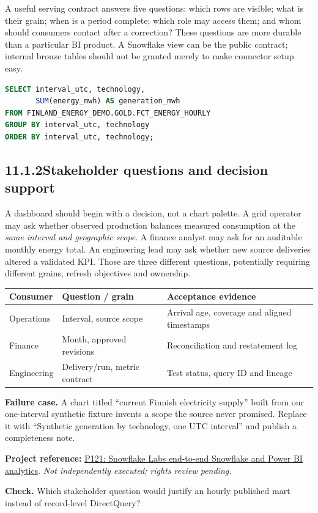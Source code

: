 \documentclass[11pt,twoside]{article}
\newcommand{\topic}[2]{\subsection*{#1\quad #2}}
\newcommand{\repo}[2]{\par\begingroup\fontsize{8.0}{9.6}\selectfont\sffamily\color{inkgray}\textbf{Project reference:} \href{#2}{#1}. \textit{Not independently executed; rights review pending.}\par\endgroup}
\begin{document}
A useful serving contract answers five questions: which rows are visible; what is their grain; when is a period complete; which role may access them; and whom should consumers contact after a correction? These questions are more durable than a particular BI product. A Snowflake view can be the public contract; internal bronze tables should not be granted merely to make connector setup easy.
\begin{lstlisting}[language=SQL,caption={Illustrative read-only inspection of the serving grain; not cloud-tested.}]
SELECT interval_utc, technology,
       SUM(energy_mwh) AS generation_mwh
FROM FINLAND_ENERGY_DEMO.GOLD.FCT_ENERGY_HOURLY
GROUP BY interval_utc, technology
ORDER BY interval_utc, technology;
\end{lstlisting}
\topic{11.1.2}{Stakeholder questions and decision support}
A dashboard should begin with a decision, not a chart palette. A grid operator may ask whether observed production balances measured consumption at the \emph{same interval and geographic scope}. A finance analyst may ask for an auditable monthly energy total. An engineering lead may ask whether new source deliveries altered a validated KPI. Those are three different questions, potentially requiring different grains, refresh objectives and ownership.
\begin{center}\renewcommand{\arraystretch}{1.1}\begin{tabularx}{\linewidth}{@{}p{30mm}XX@{}}\toprule
\textbf{Consumer}&\textbf{Question / grain}&\textbf{Acceptance evidence}\\\midrule
Operations&Interval, source scope&Arrival age, coverage and aligned timestamps\\
Finance&Month, approved revisions&Reconciliation and restatement log\\
Engineering&Delivery/run, metric contract&Test status, query ID and lineage\\\bottomrule\end{tabularx}\end{center}
\textbf{Failure case.} A chart titled ``current Finnish electricity supply'' built from our one-interval synthetic fixture invents a scope the source never promised. Replace it with ``Synthetic generation by technology, one UTC interval'' and publish a completeness note.
\repo{P121: Snowflake Labs end-to-end Snowflake and Power BI analytics}{https://github.com/Snowflake-Labs/sfguide-end-to-end-analytics-with-snowflake-and-power-bi}
\textbf{Check.} Which stakeholder question would justify an hourly published mart instead of record-level DirectQuery?
\end{document}
